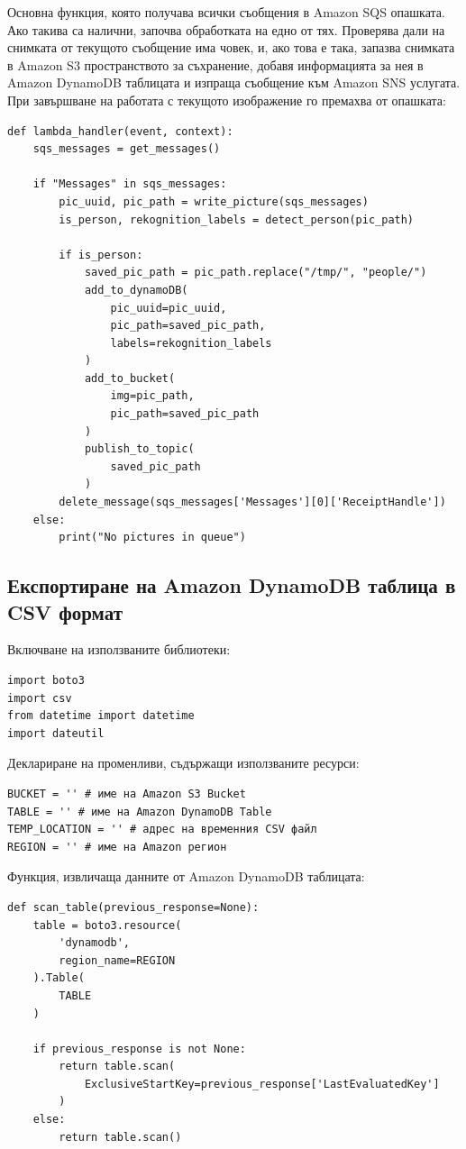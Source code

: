 \documentclass[12pt]{article}
\begin{document}
Основна функция, която получава всички съобщения в Amazon SQS опашката. Ако такива са налични, започва обработката на едно от тях. Проверява дали на снимката от текущото съобщение има човек, и, ако това е така, запазва снимката в Amazon S3 пространството за съхранение, добавя информацията за нея в Amazon DynamoDB таблицата и изпраща съобщение към Amazon SNS услугата. При завършване на работата с текущото изображение го премахва от опашката:
\begin{verbatim}
def lambda_handler(event, context):
    sqs_messages = get_messages()

    if "Messages" in sqs_messages:
        pic_uuid, pic_path = write_picture(sqs_messages)
        is_person, rekognition_labels = detect_person(pic_path)

        if is_person:
            saved_pic_path = pic_path.replace("/tmp/", "people/")
            add_to_dynamoDB(
                pic_uuid=pic_uuid,
                pic_path=saved_pic_path,
                labels=rekognition_labels
            )
            add_to_bucket(
                img=pic_path,
                pic_path=saved_pic_path
            )
            publish_to_topic(
                saved_pic_path
            )
        delete_message(sqs_messages['Messages'][0]['ReceiptHandle'])
    else:
        print("No pictures in queue")

\end{verbatim}

\clearpage
\pagebreak


\subsection{Експортиране на Amazon DynamoDB таблица в CSV формат} \label{subsec-dynamodb-s3}

\hspace{\parindent}Включване на използваните библиотеки:
\begin{verbatim}
import boto3
import csv
from datetime import datetime
import dateutil
\end{verbatim}

Деклариране на променливи, съдържащи използваните ресурси:
\begin{verbatim}
BUCKET = '' # име на Amazon S3 Bucket
TABLE = '' # име на Amazon DynamoDB Table
TEMP_LOCATION = '' # адрес на временния CSV файл
REGION = '' # име на Amazon регион
\end{verbatim}

Функция, извличаща данните от Amazon DynamoDB таблицата:
\begin{verbatim}
def scan_table(previous_response=None):
    table = boto3.resource(
        'dynamodb',
        region_name=REGION
    ).Table(
        TABLE
    )

    if previous_response is not None:
        return table.scan(
            ExclusiveStartKey=previous_response['LastEvaluatedKey']
        )
    else:
        return table.scan()
\end{verbatim}
\end{document}
